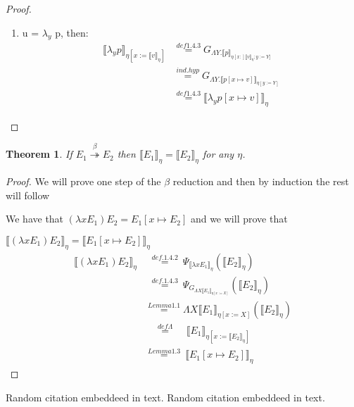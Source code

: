 \documentclass{article}
\newtheorem{theorem}{Theorem}[section] %
\begin{document}
\begin{proof}
\begin{enumerate}
			\item u = $\lambda_y$ p, then:
			\begin{equation*}
			\begin{split}
				\llbracket \lambda_y p \rrbracket_{\eta [x := 
				\llbracket v \rrbracket_{\eta}]}
 				&\stackrel{def 1.4.3}{=}
				G_{\Lambda Y. \llbracket p \rrbracket_{
					\eta [x :] \llbracket v \rrbracket_{\eta} ; 
						y := Y]}} \\
 				&\stackrel{ind.hyp}{=}
				G_{\Lambda Y. \llbracket p[x \mapsto v] \rrbracket_{
					\eta[ y:=Y]} } \\
 				&\stackrel{def 1.4.3}{=}
				\llbracket \lambda_y p[x \mapsto v]\rrbracket_{\eta}
			\end{split}
			\end{equation*}
		\end{enumerate}
	\end{proof}

	\begin{theorem}
		If $E_1 \stackrel{\beta}{\twoheadrightarrow}  E_2$ then 
			$\llbracket E_1
		\rrbracket_{\eta} = \llbracket E_2 \rrbracket_{\eta}$
		for any $\eta$.
	\end{theorem}
	\begin{proof}
		We will prove one step of the $\beta$ reduction and then
		by induction the rest will follow

		We have that $(\lambda x E_1) E_2 = E_1 [x \mapsto E_2]$
		and we will prove that 

		$\llbracket (\lambda x E_1) E_2
		\rrbracket_{\eta} = \llbracket E_1 [x \mapsto E_2] 
		\rrbracket_{\eta}$
		\begin{equation*}
     \begin{split}
			\llbracket (\lambda x E_1) E_2 \rrbracket_{\eta}
			&\:\,\stackrel{def. 1.4.2}{=} \:
			\Psi_{\llbracket \lambda x E_1 \rrbracket_{\eta}}
				(\llbracket E_2 \rrbracket_{\eta}) \\
			&\:\,\stackrel{def. 1.4.3}{=} \:
			\Psi_{G_{\Lambda X \llbracket E_1 \rrbracket_{
				\eta [x := X]}}}
				(\llbracket E_2 \rrbracket_{\eta}) \\
			&\stackrel{Lemma 1.1}{=}
				\Lambda X \llbracket E_1 \rrbracket_{\eta [x := X]}
				(\llbracket E_2 \rrbracket_{\eta}) \\
			&\;\;\:\:\stackrel{def \Lambda}{=}\:\:\:\:\:
				\llbracket E_1 \rrbracket_
					{\eta [x := \llbracket E_2 \rrbracket_{\eta}]} \\
			&\stackrel{Lemma 1.3}{=}\:
				\llbracket E_1 [ x \mapsto E_2 ] \rrbracket_{\eta}
     \end{split}
		\end{equation*}
	\end{proof}

	Random citation \cite{COM_COOPER} embeddeed in text.
	Random citation \cite{COM_ODIFREDDI} embeddeed in text.

	\newpage
	
	
\end{document}
